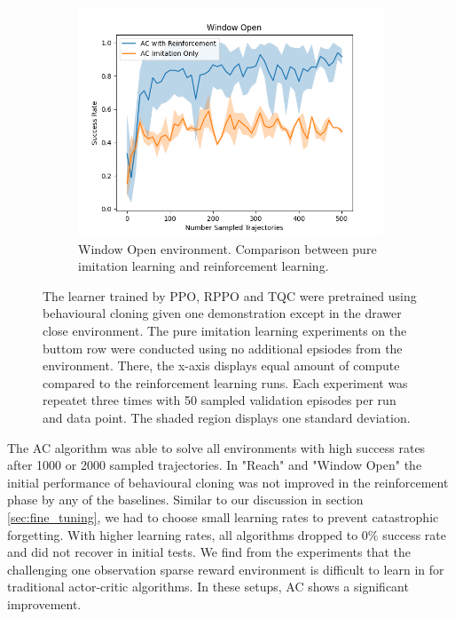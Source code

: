 \begin{figure}[htbp]
\begin{subfigure}[t]{0.45\textwidth}
      \includegraphics[width=\textwidth]{images/1_2000_imi/Window Open.png}
      \caption{Window Open environment. Comparison between pure imitation learning and reinforcement learning.}
    \end{subfigure}
    \caption{
    The learner trained by PPO, RPPO and TQC were pretrained using behavioural cloning given one demonstration except in the drawer close environment. 
    The pure imitation learning experiments on the buttom row were conducted using no additional epsiodes from the environment. There, the x-axis 
    displays equal amount of compute compared to the reinforcement learning runs.
    Each experiment was repeatet three times with 
    50 sampled validation episodes per run and data point. The shaded region displays one standard deviation.}
    \label{fig:guided_ref}
\end{figure}

The AC algorithm was able to solve all environments with high success rates after 1000 or 2000 sampled trajectories. In "Reach" and "Window Open" the initial performance
of behavioural cloning was not improved in the reinforcement phase by any of the baselines. Similar to our discussion in section \ref{sec:fine_tuning},
we had to choose small learning rates to prevent catastrophic forgetting. With higher learning rates, all algorithms dropped to $0 \%$ success rate and did
not recover in initial tests. We find from the experiments that the challenging one observation sparse reward environment is difficult to learn in for
traditional actor-critic algorithms. In these setups, AC shows a significant improvement.\\

